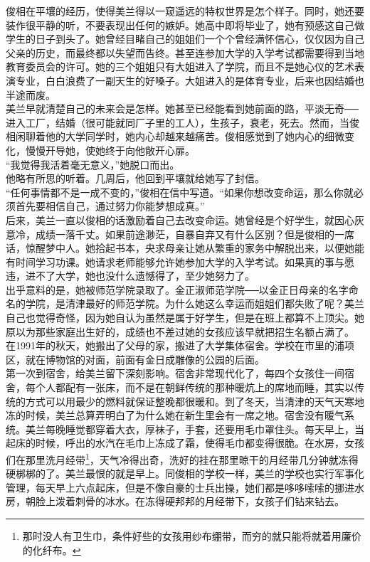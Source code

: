 俊相在平壤的经历，使得美兰得以一窥遥远的特权世界是怎个样子。同时，她还要装作很平静的听，不要表现出任何的嫉妒。她高中即将毕业了，她有预感这自己做学生的日子到头了。她曾经目睹自己的姐姐们一个个曾经满怀信心，仅仅因为自己父亲的历史，而最终都以失望而告终。甚至连参加大学的入学考试都需要得到当地教育委员会的许可。她的三个姐姐只有大姐进入了学院，而且不是她心仪的艺术表演专业，白白浪费了一副天生的好嗓子。大姐进入的是体育专业，后来也因结婚也半途而废。\\

美兰早就清楚自己的未来会是怎样。她甚至已经能看到她前面的路，平淡无奇──进入工厂，结婚（很可能就同厂子里的工人），生孩子，衰老，死去。然而，当俊相闲聊着他的大学同学时，她内心却越来越痛苦。俊相感觉到了她内心的细微变化，慢慢开导她，使她终于向他敞开心扉。\\

“我觉得我活着毫无意义，”她脱口而出。\\

他略有所思的听着。几周后，他回到平壤就给她写了封信。\\

“任何事情都不是一成不变的，”俊相在信中写道。“如果你想改变命运，那么你就必须首先要相信自己，通过努力你能梦想成真。”\\

后来，美兰一直以俊相的话激励着自己去改变命运。她曾经是个好学生，就因心灰意冷，成绩一落千丈。如果前途渺茫，自暴自弃又有什么区别？但是俊相的一席话，惊醒梦中人。她拾起书本，央求母亲让她从繁重的家务中解脱出来，以便她能有时间学习功课。她请求老师能够允许她参加大学的入学考试。如果真的事与愿违，进不了大学，她也没什么遗憾得了，至少她努力了。\\

出乎意料的是，她被师范学院录取了。金正淑师范学院──以金正日母亲的名字命名的学院，是清津最好的师范学院。为什么她这么幸运而姐姐们都失败了呢？美兰自己也觉得奇怪，因为她自认为虽然是属于好学生，但是在班上都算不上顶尖。她原以为那些家庭出生好的，成绩也不差过她的女孩应该早就把招生名额占满了。\\

在1991年的秋天，她搬出了父母的家，搬进了大学集体宿舍。学校在市里的浦项区，就在博物馆的对面，前面有金日成雕像的公园的后面。\\

第一次到宿舍，给美兰留下深刻影响。宿舍非常现代化了，每四个女孩住一间宿舍，每个人都配有一张床，而不是在朝鲜传统的那种暖炕上的席地而睡，其实以传统的方式可以用最少的燃料就保证整晚都很暖和。到了冬天，当清津的天气天寒地冻的时候，美兰总算弄明白了为什么她在新生里会有一席之地。宿舍没有暖气系统。美兰每晚睡觉都穿着大衣，厚袜子，手套，还要用毛巾罩住头。每天早上，当起床的时候，呼出的水汽在毛巾上冻成了霜，使得毛巾都变得很脆。在水房，女孩们在那里洗月经带\footnote{那时没人有卫生巾，条件好些的女孩用纱布绷带，而穷的就只能将就着用廉价的化纤布。}，天气冷得出奇，洗好的挂在那里晾干的月经带几分钟就冻得硬梆梆的了。美兰最恨的就是早上。同俊相的学校一样，美兰的学校也实行军事化管理，每天早上六点起床，但是不像自豪的士兵出操，她们都是哆哆嗦嗦的挪进水房，朝脸上泼着刺骨的冰水。在冻得硬邦邦的月经带下，女孩子们钻来钻去。\\

